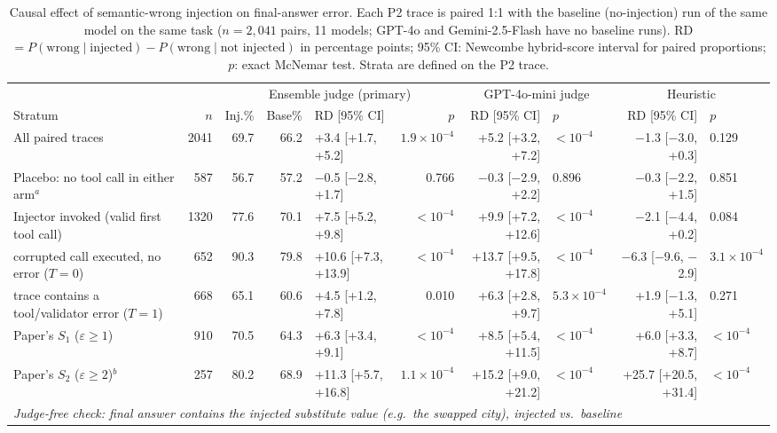 \begin{table}[t]
\centering
\small
\caption{Causal effect of semantic-wrong injection on final-answer error. Each P2 trace is paired 1:1 with the baseline (no-injection) run of the same model on the same task ($n=2{,}041$ pairs, 11 models; GPT-4o and Gemini-2.5-Flash have no baseline runs). RD $=P(\text{wrong}\mid\text{injected})-P(\text{wrong}\mid\text{not injected})$ in percentage points; 95\% CI: Newcombe hybrid-score interval for paired proportions; $p$: exact McNemar test. Strata are defined on the P2 trace.}
\label{tab:paired_rd}
\setlength{\tabcolsep}{4pt}
\begin{tabular}{l r r r l r r l r l}
\toprule
 & & \multicolumn{4}{c}{Ensemble judge (primary)} & \multicolumn{2}{c}{GPT-4o-mini judge} & \multicolumn{2}{c}{Heuristic} \\
\cmidrule(lr){3-6}\cmidrule(lr){7-8}\cmidrule(lr){9-10}
Stratum & $n$ & Inj.\% & Base\% & RD [95\% CI] & $p$ & RD [95\% CI] & $p$ & RD [95\% CI] & $p$ \\
\midrule
All paired traces & 2041 & 69.7 & 66.2 & +3.4 [+1.7, +5.2] & $1.9\times10^{-4}$ & +5.2 [+3.2, +7.2] & $<10^{-4}$ & $-$1.3 [$-$3.0, +0.3] & 0.129 \\
Placebo: no tool call in either arm$^{a}$ & 587 & 56.7 & 57.2 & $-$0.5 [$-$2.8, +1.7] & 0.766 & $-$0.3 [$-$2.9, +2.2] & 0.896 & $-$0.3 [$-$2.2, +1.5] & 0.851 \\
Injector invoked (valid first tool call) & 1320 & 77.6 & 70.1 & +7.5 [+5.2, +9.8] & $<10^{-4}$ & +9.9 [+7.2, +12.6] & $<10^{-4}$ & $-$2.1 [$-$4.4, +0.2] & 0.084 \\
\quad corrupted call executed, no error ($T{=}0$) & 652 & 90.3 & 79.8 & +10.6 [+7.3, +13.9] & $<10^{-4}$ & +13.7 [+9.5, +17.8] & $<10^{-4}$ & $-$6.3 [$-$9.6, $-$2.9] & $3.1\times10^{-4}$ \\
\quad trace contains a tool/validator error ($T{=}1$) & 668 & 65.1 & 60.6 & +4.5 [+1.2, +7.8] & 0.010 & +6.3 [+2.8, +9.7] & $5.3\times10^{-4}$ & +1.9 [$-$1.3, +5.1] & 0.271 \\
Paper's $S_1$ ($\varepsilon\geq1$) & 910 & 70.5 & 64.3 & +6.3 [+3.4, +9.1] & $<10^{-4}$ & +8.5 [+5.4, +11.5] & $<10^{-4}$ & +6.0 [+3.3, +8.7] & $<10^{-4}$ \\
Paper's $S_2$ ($\varepsilon\geq2$)$^{b}$ & 257 & 80.2 & 68.9 & +11.3 [+5.7, +16.8] & $1.1\times10^{-4}$ & +15.2 [+9.0, +21.2] & $<10^{-4}$ & +25.7 [+20.5, +31.4] & $<10^{-4}$ \\
\midrule
\multicolumn{10}{l}{\emph{Judge-free check: final answer contains the injected substitute value (e.g.\ the swapped city), injected vs.\ baseline}} \\

\end{tabular}
\end{table}
